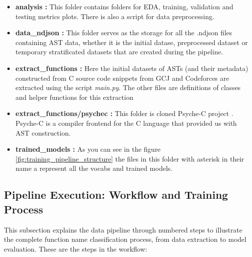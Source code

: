 \documentclass[10pt,english,a4paper]{report}
\begin{document}
\begin{itemize}
    \item \textbf{analysis :} This folder contains folders for EDA, training, validation
    and testing metrics plots. There is also a script for data preprocessing.

    \item \textbf{data\_ndjson :} This folder serves as the storage for all the .ndjson files
    containing AST data, whether it is the initial datase, preprocessed dataset or temporary stratificated datasets
    that are created during the pipeline.

    \item \textbf{extract\_functions :} Here the initial datasets of ASTs (and their metadata) constructed from C source code snippets from GCJ and Codeforces
    are extracted using the script \textit{main.py}. The other files are definitions of classes and helper functions 
    for this extraction 
    \item \textbf{extract\_functions/psychec :} This folder is cloned Psyche-C project \cite{psychec}. Psyche-C is a compiler frontend for the C language that provided us with AST construction.

    \item \textbf{trained\_models :} As you can see in the figure \ref{fig:training_pipeline_structure} the files in this folder with asterisk in their name a represent all the vocabs and trained models.


\end{itemize}

\subsection{Pipeline Execution: Workflow and Training Process}

This subsection explains the data pipeline through numbered steps to 
illustrate the complete function name classification process, from data
 extraction to model evaluation. These are the steps in the workflow:
\end{document}
